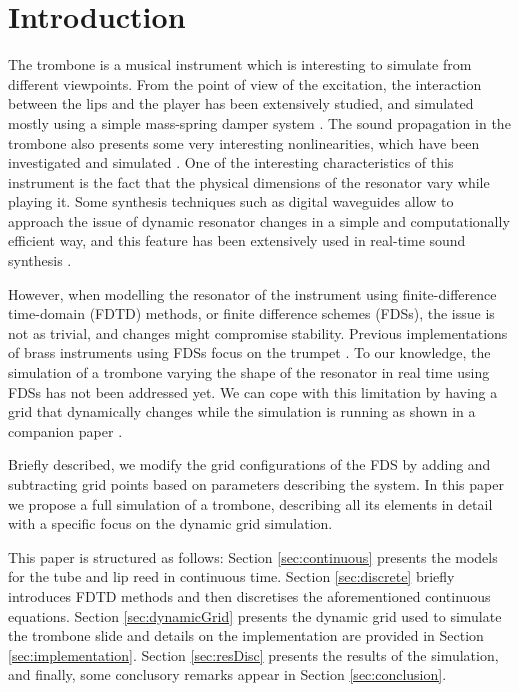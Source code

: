 \section{Introduction}\label{sec:introduction}

The trombone is a musical instrument which is interesting to simulate from different viewpoints.
From the point of view of the excitation, the interaction between the lips and the player has been extensively studied, and simulated mostly using a simple mass-spring damper system \cite{campbell2004brass}.
The sound propagation in the trombone also presents some very interesting nonlinearities, which have been investigated and simulated
\cite{campbell2004brass, msallam1997physical,msallam2000physical}.
One of the interesting characteristics of this instrument is the fact that the physical dimensions of the resonator vary while playing it.
Some synthesis techniques such as digital waveguides allow to approach the issue of dynamic resonator changes in a simple and computationally efficient way, and this feature has been extensively used in real-time sound synthesis \cite{cook2002real}.

However, when modelling the resonator of the instrument using finite-difference time-domain (FDTD) methods, or finite difference schemes (FDSs), the issue is not as trivial, and changes might compromise stability.
Previous implementations of brass instruments using FDSs focus on the trumpet 
 \cite{harrison2015environment}. To our knowledge, the simulation of a trombone varying the shape of the resonator in real time using FDSs has not been addressed yet.
We can cope with this limitation  by having a grid that 
 dynamically changes while the simulation is running as shown in a companion paper \cite{Willemsen2021}.

Briefly described, we modify the grid configurations of the FDS by adding and subtracting grid points based on parameters describing the system.
In this paper we propose a full simulation of a trombone, describing all its elements in detail with a specific focus on the dynamic grid simulation.

This paper is structured as follows: Section \ref{sec:continuous} presents the models for the tube and lip reed in continuous time. Section \ref{sec:discrete} briefly introduces FDTD methods and then discretises the aforementioned continuous equations. Section \ref{sec:dynamicGrid} presents the dynamic grid used to simulate the trombone slide and details on the implementation are provided in Section \ref{sec:implementation}. Section \ref{sec:resDisc} presents the results of the simulation, and finally, some conclusory remarks appear in Section \ref{sec:conclusion}.
